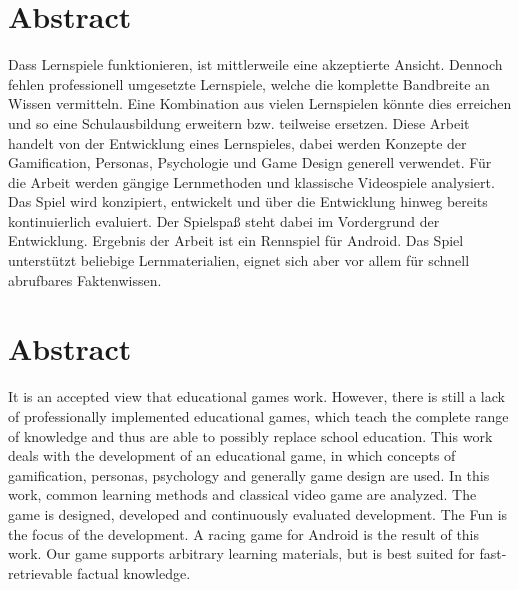 \section*{Abstract}
Dass Lernspiele funktionieren, ist mittlerweile eine akzeptierte Ansicht. Dennoch fehlen professionell umgesetzte Lernspiele, welche die komplette Bandbreite an Wissen vermitteln. Eine Kombination aus vielen Lernspielen könnte dies erreichen und so eine Schulausbildung erweitern bzw. teilweise ersetzen.
Diese Arbeit handelt von der Entwicklung eines Lernspieles, dabei werden Konzepte der Gamification, Personas, Psychologie und Game Design generell verwendet. Für die Arbeit werden gängige Lernmethoden und klassische Videospiele analysiert. Das Spiel wird konzipiert, entwickelt und über die Entwicklung hinweg bereits kontinuierlich evaluiert. Der Spielspaß steht dabei im Vordergrund der Entwicklung.
Ergebnis der Arbeit ist ein Rennspiel für Android. Das Spiel unterstützt beliebige Lernmaterialien, eignet sich aber vor allem für schnell abrufbares Faktenwissen.

\vfill

\section*{Abstract}
It is an accepted view that educational games work. However, there is still a lack of professionally implemented educational games, which teach the complete range of knowledge and thus are able to possibly replace school education.
This work deals with the development of an educational game, in which concepts of gamification, personas, psychology and generally game design are used. In this work, common learning methods and classical video game are analyzed. The game is designed, developed and continuously evaluated development. The Fun is the focus of the development.
A racing game for Android is the result of this work. Our game supports arbitrary learning materials, but is best suited for fast-retrievable factual knowledge.

\vfill\vfill\newpage
